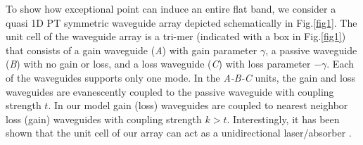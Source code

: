 \documentclass[aps,prl,twocolumn,showpacs,groupedaddress,amsmath,amssymb]{revtex4}
\begin{document}

To show how exceptional point can induce an entire flat band, we consider a quasi 1D PT symmetric waveguide array depicted schematically in Fig.\ref{fig1}. The unit cell of the waveguide array is a tri-mer (indicated with a box in Fig.\ref{fig1}) that consists of a gain waveguide (\textit{A}) with gain parameter $\gamma$, a passive waveguide (\textit{B}) with no gain or loss, and a loss waveguide (\textit{C}) with loss parameter $-\gamma$. Each of the waveguides supports only one mode. In the \textit{A-B-C} units, the gain and loss waveguides are evanescently coupled to the passive waveguide with coupling strength $t$. In our model gain (loss) waveguides are coupled to nearest neighbor loss (gain) waveguides with coupling strength $k>t$. Interestingly, it has been shown that the unit cell of our array can act as a unidirectional laser/absorber \cite{28,29}. 
\end{document}
